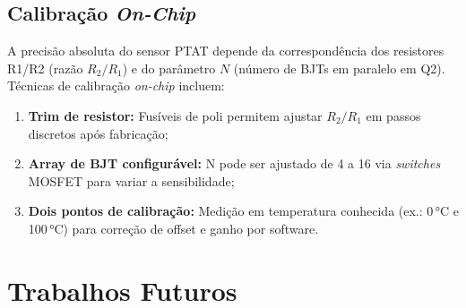 \documentclass[12pt,a4paper]{article}
\begin{document}
\subsection{Calibração \textit{On-Chip}}

A precisão absoluta do sensor PTAT depende da correspondência dos resistores R1/R2
(razão $R_2/R_1$) e do parâmetro $N$ (número de BJTs em paralelo em Q2). Técnicas de
calibração \textit{on-chip} incluem:
\begin{enumerate}[leftmargin=2em,label=\textbf{(\arabic*)}]
  \item \textbf{Trim de resistor:} Fusíveis de poli permitem ajustar $R_2/R_1$ em passos
        discretos após fabricação;
  \item \textbf{Array de BJT configurável:} N pode ser ajustado de 4 a 16 via \textit{switches}
        MOSFET para variar a sensibilidade;
  \item \textbf{Dois pontos de calibração:} Medição em temperatura conhecida (ex.: 0\,°C e
        100\,°C) para correção de offset e ganho por software.
\end{enumerate}

\section{Trabalhos Futuros}
\end{document}
